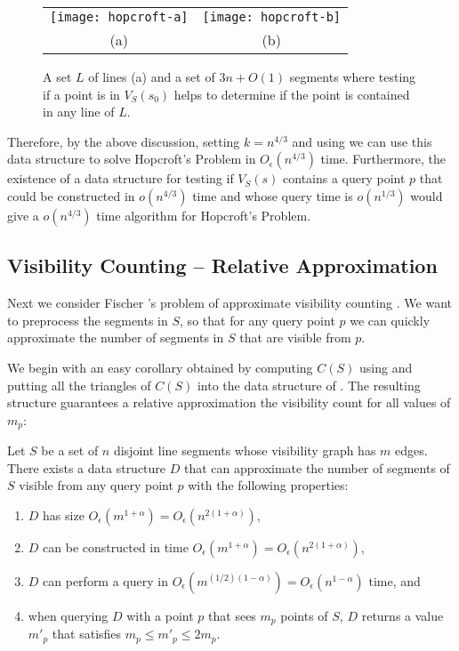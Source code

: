 \documentclass{patmorin}
\newcommand{\Oe}{O_\epsilon}
\begin{document}
\begin{figure}
  \begin{center}
    \begin{tabular}{cc}
      \texttt{[image: hopcroft-a]} &
      \texttt{[image: hopcroft-b]} \\
      (a) & (b)
    \end{tabular}
  \end{center}
  \caption{A set $L$ of lines (a) and a set of $3n+O(1)$ segments where
           testing if a point is in $V_S(s_0)$ helps to determine if
           the point is contained in any line of $L$.}
\end{figure}

Therefore, by the above discussion, setting $k=n^{4/3}$ and using
 we can use this data structure to solve Hopcroft's
Problem in $\Oe(n^{4/3})$ time.  Furthermore, the existence of a data
structure for testing if $V_S(s)$ contains a query point $p$ that could be
constructed in $o(n^{4/3})$ time and whose query time is $o(n^{1/3})$ would
give a $o(n^{4/3})$ time algorithm for Hopcroft's Problem.

\subsection{Visibility Counting -- Relative Approximation}

Next we consider Fischer \etal's problem of approximate visibility
counting \cite{fhjmz08,fhjmz09}.  We want to preprocess the segments
in $S$, so that for any query point $p$ we can quickly approximate the
number of segments in $S$ that are visible from $p$.

We begin with an easy corollary obtained by computing $C(S)$ using
 and putting all the triangles of $C(S)$ into the
data structure of .  The resulting structure
guarantees a relative approximation the visibility count for all values
of $m_p$:

\begin{cor}
  Let $S$ be a set of $n$ disjoint line segments whose visibility graph
  has $m$ edges.  There exists a data structure $D$ that can approximate
  the number of segments of $S$ visible from any query point $p$ with
  the following properties:
  \begin{enumerate}
    \item $D$ has size $\Oe(m^{1+\alpha}) = \Oe(n^{2(1+\alpha)})$,
    \item $D$ can be constructed in time $\Oe(m^{1+\alpha}) =
          \Oe(n^{2(1+\alpha)})$,
    \item $D$ can perform a query in $\Oe(m^{(1/2)(1-\alpha)}) =
          \Oe(n^{1-\alpha})$ time, and
    \item when querying $D$ with a point $p$ that sees $m_p$ points of
          $S$, $D$ returns a value $m'_p$ that satisfies $m_p \le m'_p
          \le 2m_p$.
  \end{enumerate}
\end{cor}
\end{document}
